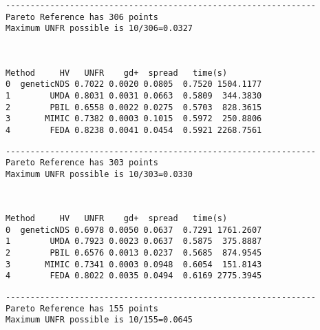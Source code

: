 \documentclass[11pt]{article}
\begin{document}
    
    \begin{Verbatim}[commandchars=\\\{\}]
---------------------------------------------------------------
Pareto Reference has 306 points
Maximum UNFR possible is 10/306=0.0327
    \end{Verbatim}

    \begin{center}
    \end{center}
    { \hspace*{\fill} \\}
    
    
    \begin{Verbatim}[commandchars=\\\{\}]
       Method     HV   UNFR    gd+  spread   time(s)
0  geneticNDS 0.7022 0.0020 0.0805  0.7520 1504.1177
1        UMDA 0.8031 0.0031 0.0663  0.5809  344.3830
2        PBIL 0.6558 0.0022 0.0275  0.5703  828.3615
3       MIMIC 0.7382 0.0003 0.1015  0.5972  250.8806
4        FEDA 0.8238 0.0041 0.0454  0.5921 2268.7561
    \end{Verbatim}

    
    \begin{Verbatim}[commandchars=\\\{\}]
---------------------------------------------------------------
Pareto Reference has 303 points
Maximum UNFR possible is 10/303=0.0330
    \end{Verbatim}

    \begin{center}
    \end{center}
    { \hspace*{\fill} \\}
    
    
    \begin{Verbatim}[commandchars=\\\{\}]
       Method     HV   UNFR    gd+  spread   time(s)
0  geneticNDS 0.6978 0.0050 0.0637  0.7291 1761.2607
1        UMDA 0.7923 0.0023 0.0637  0.5875  375.8887
2        PBIL 0.6576 0.0013 0.0237  0.5685  874.9545
3       MIMIC 0.7341 0.0003 0.0948  0.6054  151.8143
4        FEDA 0.8022 0.0035 0.0494  0.6169 2775.3945
    \end{Verbatim}

    
    \begin{Verbatim}[commandchars=\\\{\}]
---------------------------------------------------------------
Pareto Reference has 155 points
Maximum UNFR possible is 10/155=0.0645
    \end{Verbatim}
\end{document}
